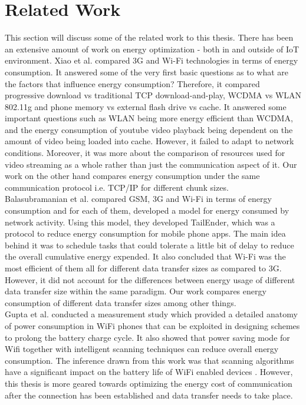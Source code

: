 \chapter{Related Work}
This section will discuss some of the related work to this thesis. There has been an extensive amount of work 
on energy optimization - both in and outside of IoT environment. Xiao et al. \cite{4756414} compared 3G and Wi-Fi 
technologies in terms of energy consumption. It answered some of the very first basic questions as to what are the 
factors that influence energy consumption? Therefore, it compared progressive download vs traditional TCP download-and-play, 
WCDMA vs WLAN 802.11g and phone memory vs external flash drive vs cache. It answered some important questions 
such as WLAN being more energy efficient than WCDMA, and the energy consumption of youtube video playback being 
dependent on the amount of video being loaded into cache. However, it failed to adapt to network conditions. Moreover, 
it was more about the comparison of resources used for video streaming as a whole rather than just the communication aspect of it. 
Our work on the other hand compares energy consumption under the same communication protocol i.e. TCP/IP for different 
chunk sizes. \\
Balasubramanian et al. \cite{confbal} compared GSM, 3G and Wi-Fi in terms of energy consumption and for each of them, 
developed a model for energy consumed by network activity. Using this model, they developed TailEnder, which was a 
protocol to reduce energy consumption for mobile phone apps. The main idea behind it was to schedule tasks that 
could tolerate a little bit of delay to reduce the overall cumulative energy expended. It also concluded that Wi-Fi 
was the most efficient of them all for different data transfer sizes as compared to 3G. However, it did not account for 
the differences between energy usage of different data transfer size within the same paradigm. Our work compares 
energy consumption of different data transfer sizes among other things. \\
Gupta et al. \cite{4292824} conducted a measurement study which provided a detailed anatomy of power consumption 
in WiFi phones that can be exploited in designing schemes to prolong the battery charge cycle. It also showed that 
power saving mode for Wifi together with intelligent scanning techniques can reduce overall energy consumption. 
The inference drawn from this work was that scanning algorithms have a significant impact on the battery life of 
WiFi enabled devices \cite{4292824}. However, this thesis is more geared towards optimizing the energy cost of 
communication after the connection has been established and data transfer needs to take place. \\